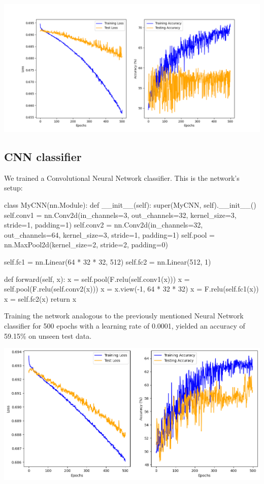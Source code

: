 \includegraphics[width=\textwidth]{Figures/NN_classifier_charts.png}

\subsection*{CNN classifier}

We trained a Convolutional Neural Network classifier. This is the network's
setup:

\begin{python}
    class MyCNN(nn.Module):
    def __init__(self):
        super(MyCNN, self).__init__()
        self.conv1 = nn.Conv2d(in_channels=3, out_channels=32,
        kernel_size=3, stride=1,
        padding=1)
        self.conv2 = nn.Conv2d(in_channels=32, out_channels=64,
        kernel_size=3,
        stride=1,
        padding=1)
        self.pool = nn.MaxPool2d(kernel_size=2, stride=2, padding=0)

        self.fc1 = nn.Linear(64 * 32 * 32, 512)
        self.fc2 = nn.Linear(512, 1)

    def forward(self, x):
        x = self.pool(F.relu(self.conv1(x)))
        x = self.pool(F.relu(self.conv2(x)))
        x = x.view(-1, 64 * 32 * 32)
        x = F.relu(self.fc1(x))
        x = self.fc2(x)
        return x
\end{python}

Training the network analogous to the previously mentioned Neural Network
classifier for 500 epochs with a learning rate of 0.0001, yielded an accuracy of
59.15\% on unseen test data.

\includegraphics*[width=\textwidth]{Figures/CNN_classifier_charts.png}

